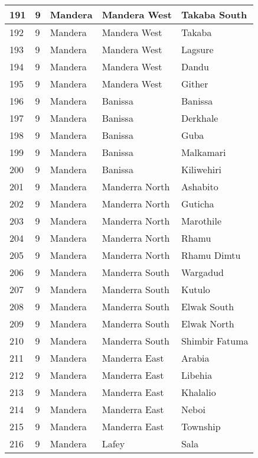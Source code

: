 \begin{table}[!ht]
\begin{tabular}{|l|l|l|l|l|}
        191 & 9 & Mandera & Mandera West & Takaba South \\ \hline
        192 & 9 & Mandera & Mandera West & Takaba \\ \hline
        193 & 9 & Mandera & Mandera West & Lagsure \\ \hline
        194 & 9 & Mandera & Mandera West & Dandu \\ \hline
        195 & 9 & Mandera & Mandera West & Gither \\ \hline
        196 & 9 & Mandera & Banissa & Banissa \\ \hline
        197 & 9 & Mandera & Banissa & Derkhale \\ \hline
        198 & 9 & Mandera & Banissa & Guba \\ \hline
        199 & 9 & Mandera & Banissa & Malkamari \\ \hline
        200 & 9 & Mandera & Banissa & Kiliwehiri \\ \hline
        201 & 9 & Mandera & Manderra North & Ashabito \\ \hline
        202 & 9 & Mandera & Manderra North & Guticha \\ \hline
        203 & 9 & Mandera & Manderra North & Marothile \\ \hline
        204 & 9 & Mandera & Manderra North & Rhamu \\ \hline
        205 & 9 & Mandera & Manderra North & Rhamu Dimtu \\ \hline
        206 & 9 & Mandera & Manderra South & Wargadud \\ \hline
        207 & 9 & Mandera & Manderra South & Kutulo \\ \hline
        208 & 9 & Mandera & Manderra South & Elwak South \\ \hline
        209 & 9 & Mandera & Manderra South & Elwak North \\ \hline
        210 & 9 & Mandera & Manderra South & Shimbir Fatuma \\ \hline
        211 & 9 & Mandera & Manderra East & Arabia \\ \hline
        212 & 9 & Mandera & Manderra East & Libehia \\ \hline
        213 & 9 & Mandera & Manderra East & Khalalio \\ \hline
        214 & 9 & Mandera & Manderra East & Neboi \\ \hline
        215 & 9 & Mandera & Manderra East & Township \\ \hline
        216 & 9 & Mandera & Lafey & Sala \\ \hline

\end{tabular}
\end{table}
